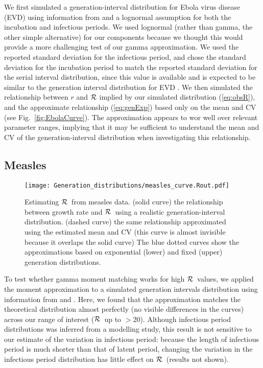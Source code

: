 \documentclass[12pt,]{article}
\newcommand{\RR}{\ensuremath{{\cal R}}}
\newcommand{\eref}[1]{(\ref{eq:#1})}
\newcommand{\fref}[1]{Fig.~\ref{fig:#1}}
\begin{document}
We first simulated a generation-interval distribution for Ebola virus disease (EVD) using information from \cite{AylwBarb14} and a lognormal assumption for both the incubation and infectious periods.
We used lognormal (rather than gamma, the other simple alternative) for our components because we thought this would provide a more challenging test of our gamma approximation. 
We used the reported standard deviation for the infectious period, and chose the standard deviation for the incubation period to match the reported standard deviation for the serial interval distribution, since this value is available and is expected to be similar to the generation interval distribution for EVD \cite{AylwBarb14}.
We  then simulated the relationship between $r$ and $\RR$ implied by our simulated distribution \eref{obsR}, and the approximate relationship \eref{genExp} based only on the mean and CV (see \fref{EbolaCurve}). The approximation appears to wor well over relevant parameter ranges, implying that it may be sufficient to understand the mean and CV of the generation-interval distribution when investigating this relationship.

\subsection{Measles}

\begin{figure}[htbp] \centering
	\texttt{[image: Generation\_distributions/measles\_curve.Rout.pdf]}
	\caption{Estimating \RR~from measles data.
		(solid curve) the relationship between growth rate and \RR~using a realistic generation-interval distribution.
		(dashed curve) the same relationship approximated using the estimated mean and CV (this curve is almost invisible because it overlaps the solid curve)
		The blue dotted curves show the approximations based on exponential (lower) and fixed (upper) generation distributions.
	}
	\label{fig:measlesCurve}
\end{figure}

To test whether gamma moment matching works for high \RR\ values, we applied the moment approximation to a simulated generation intervals distribution using information from \cite{LessReic09} and \cite{Lloy01}. 
Here, we found that the approximation matches the theoretical distribution almost perfectly (no visible differences in the curves) across our range of interest (\RR\ up to $>20$).
Although infectious period distributions was inferred from a modelling study, this result is not sensitive to our estimate of the variation in infectious period: because the length of infectious period is much shorter than that of latent period, changing the variation in the infectious period distribution has little effect on \RR\ (results not shown). 
\end{document}
